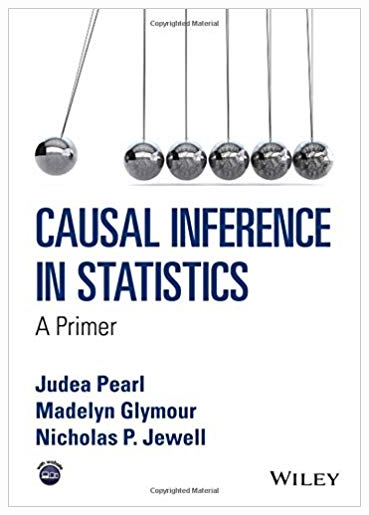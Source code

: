 \documentclass[color=usenames,dvipsnames]{beamer}\usepackage[]{graphicx}\usepackage[]{color}
\begin{document}
\begin{frame}
\begin{columns}
\begin{column}{0.19\paperwidth}
{      \vfill
      \includegraphics[width=\textwidth]{figs/Pearl_Primer} \\
    }
\end{column}
 \end{columns}
\end{frame}
\end{document}
